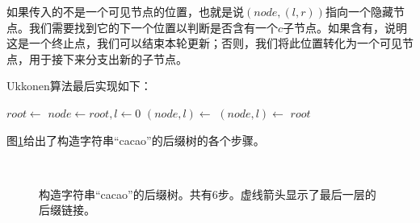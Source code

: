 \documentclass{ctexart}
\begin{document}
如果传入的不是一个可见节点的位置，也就是说$(node, (l, r))$指向一个隐藏节点。我们需要找到它的下一个位置以判断是否含有一个$c$子节点。如果含有，说明这是一个终止点，我们可以结束本轮更新；否则，我们将此位置转化为一个可见节点，用于接下来分支出新的子节点。

Ukkonen算法最后实现如下：

\begin{algorithmic}[1]
  \State $root \gets$ 
  \State $node \gets root, l \gets 0$
    \State $(node, l) \gets $ 
    \State $(node, l) \gets $ 
  \EndFor
  \State \Return $root$
\EndFunction
\end{algorithmic}

图\cref{fig:cons-stree-cacao}给出了构造字符串“cacao”的后缀树的各个步骤。

\begin{figure}[htbp]
  \centering
   \\
  \caption{构造字符串“cacao”的后缀树。共有6步。虚线箭头显示了最后一层的后缀链接。}
  \label{fig:cons-stree-cacao}
\end{figure}
\end{document}
